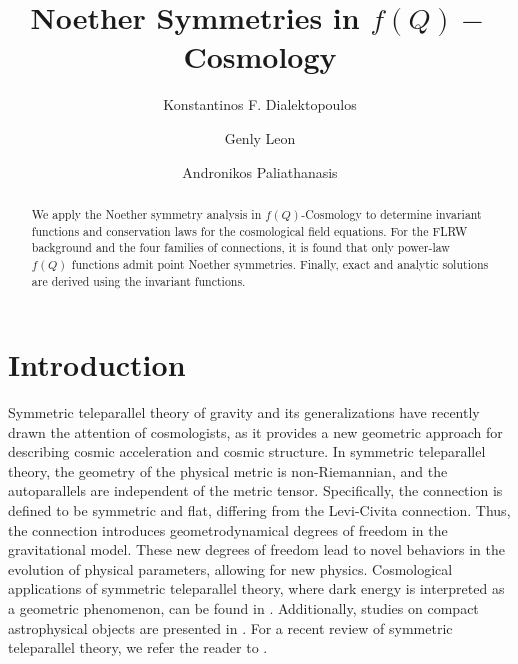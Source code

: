 \documentclass[onecolumn,superscriptaddress,secnumarabic,nobibnotes,aps,prd,nofootinbib,altaffilletter,11pt]{revtex4}
\begin{document}
\title{Noether Symmetries in $f\left( Q\right) -$Cosmology}
\author{Konstantinos F. Dialektopoulos}
\author{Genly Leon }
\author{Andronikos Paliathanasis}

\begin{abstract}
We apply the Noether symmetry analysis in $f\left( Q\right)$-Cosmology to
determine invariant functions and conservation laws for the cosmological
field equations. For the FLRW background and the four families of
connections, it is found that only power-law $f\left( Q\right)$ functions
admit point Noether symmetries. Finally, exact and analytic solutions are
derived using the invariant functions.
\end{abstract}

\maketitle

\section{Introduction}

\label{sec:intro}

Symmetric teleparallel theory of gravity \cite{Nester:1998mp} and its
generalizations \cite{fq1,fq2,fq3,fq5,sc1,gg1,gg2,gg22,gg3,gg4,gg5} have
recently drawn the attention of cosmologists, as it provides a new geometric
approach for describing cosmic acceleration and cosmic structure. In symmetric teleparallel theory, the geometry of the physical metric is
non-Riemannian, and the autoparallels are independent of the metric tensor.
Specifically, the connection is defined to be symmetric and flat, differing
from the Levi-Civita connection. Thus, the connection introduces
geometrodynamical degrees of freedom in the gravitational model. These new
degrees of freedom lead to novel behaviors in the evolution of physical
parameters, allowing for new physics. Cosmological applications of symmetric
teleparallel theory, where dark energy is interpreted as a geometric
phenomenon, can be found in \cite{cc1,cc2,cc3,cc4,cc5,cc6,cc7,cc8,cc9}.
Additionally, studies on compact astrophysical objects are presented in \cite%
{cc10,cc11,cc12,cc13,cc14}. For a recent review of symmetric teleparallel
theory, we refer the reader to \cite{revh}.
\end{document}
